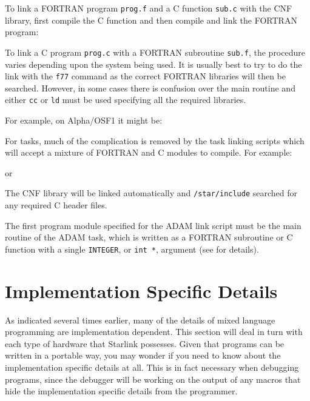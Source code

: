 \documentclass[twoside,11pt,nolof]{starlink}
\begin{document}
To link a FORTRAN program \texttt{prog.f} and a C function \texttt{sub.c} with
the CNF library, first compile the C function and then compile and link the
FORTRAN program:

\begin{terminalv}
\end{terminalv}

To link a C program \texttt{prog.c} with a FORTRAN subroutine \texttt{sub.f},
the procedure varies depending upon the system being used.
It is usually best to try to do the link with the \texttt{f77} command as the
correct FORTRAN libraries will then be searched.
However, in some cases there is confusion over the main routine and either
\texttt{cc} or \texttt{ld} must be used specifying all the required libraries.

For example, on Alpha/OSF1 it might be:

\begin{terminalv}
\end{terminalv}

For
tasks, much of the complication is removed by the task
linking scripts
 which will accept a mixture of
FORTRAN and C modules to compile. For example:
\begin{terminalv}
\end{terminalv}
or
\begin{terminalv}
\end{terminalv}
The CNF library will be linked automatically and \texttt{/star/include} searched
for any required C header files.

The first program module specified for the ADAM link script must be the main
routine of the ADAM task, which is written as a FORTRAN subroutine or C function
with a single \texttt{INTEGER}, or \texttt{int *}, argument (see
for details).

\appendix
\newpage

\section{\label{implement}Implementation Specific Details}

As indicated several times earlier, many of the details of mixed language
programming are implementation dependent. This section will deal in turn with
each type of hardware that Starlink possesses. Given that programs can be
written in a portable way, you may wonder if you need to know about the
implementation specific details at all. This is in fact necessary when
debugging programs, since the debugger will be working on the output of any
macros that hide the implementation specific details from the programmer.
\end{document}
